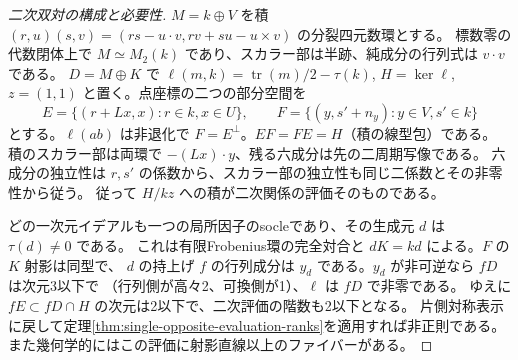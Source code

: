 \begin{proof}[二次双対の構成と必要性]
$M=k\oplus V$ を積
$(r,u)(s,v)=(rs-u\cdot v,rv+su-u\times v)$ の分裂四元数環とする。
標数零の代数閉体上で $M\simeq M_2(k)$ であり、スカラー部は半跡、純成分の行列式は $v\cdot v$ である。
$D=M\oplus K$ で $\ell(m,k)=\operatorname{tr}(m)/2-\tau(k)$,
$H=\ker\ell$, $z=(1,1)$ と置く。点座標の二つの部分空間を
\[
 E=\{(r+Lx,x):r\in k,x\in U\},\qquad
 F=\{(y,s'+n_y):y\in V,s'\in k\}
\]
とする。$\ell(ab)$ は非退化で $F=E^\perp$。$E F=F E=H$（積の線型包）である。
積のスカラー部は両環で $-(Lx)\cdot y$、残る六成分は先の二周期写像である。
六成分の独立性は $r,s'$ の係数から、スカラー部の独立性も同じ二係数とその非零性から従う。
従って $H/kz$ への積が二次関係の評価そのものである。

どの一次元イデアルも一つの局所因子のsocleであり、その生成元 $d$ は $\tau(d)\ne0$ である。
これは有限Frobenius環の完全対合と $dK=kd$ による。$F$ の $K$ 射影は同型で、
$d$ の持上げ $f$ の行列成分は $y_d$ である。$y_d$ が非可逆なら $fD$ は次元3以下で
（行列側が高々2、可換側が1）、$\ell$ は $fD$ で非零である。
ゆえに $fE\subset fD\cap H$ の次元は2以下で、二次評価の階数も2以下となる。
片側対称表示に戻して定理\ref{thm:single-opposite-evaluation-ranks}を適用すれば非正則である。
また幾何学的にはこの評価に射影直線以上のファイバーがある。
\end{proof}

